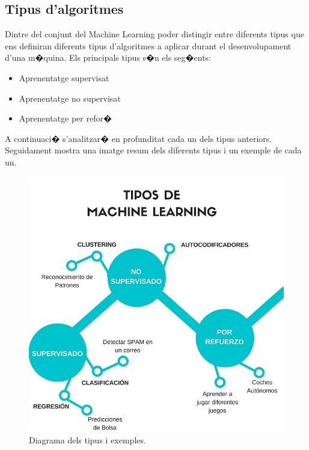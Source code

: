\documentclass[12pt,a4paper,openright,oneside]{article}
\numberwithin{equation}{section}
\theoremstyle{definition}
\begin{document}
\subsection{Tipus d'algoritmes}
Dintre del conjunt del Machine Learning poder distingir entre diferents tipus que ens definiran diferents tipus d'algoritmes a aplicar durant el desenvolupament d'una m�quina. Els principals tipus s�n els seg�ents:
\begin{itemize}
\item Aprenentatge supervisat
\item Aprenentatge no supervisat
\item Aprenentatge per refor�
\end{itemize}
A continuaci� s'analitzar� en profunditat cada un dels tipus anteriors. Seguidament mostra una imatge resum dels diferents tipus i un exemple de cada un. 
\begin{figure}[h!]
\begin{center}
\includegraphics[width=\textwidth]{typesML}
\caption{Diagrama dels tipus i exemples.}
\end{center}
\end{figure}
\end{document}
